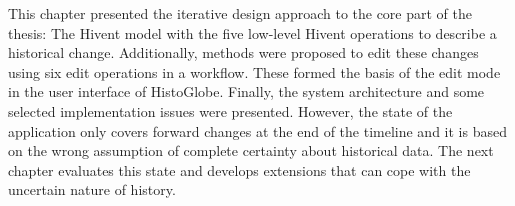 

\vspace{2em}

This chapter presented the iterative design approach to the core part of the thesis: The Hivent model with the five low-level Hivent operations to describe a historical change. Additionally, methods were proposed to edit these changes using six edit operations in a workflow.
These formed the basis of the edit mode in the user interface of HistoGlobe. Finally, the system architecture and some selected implementation issues were presented. However, the state of the application only covers forward changes at the end of the timeline and it is based on the wrong assumption of complete certainty about historical data. The next chapter evaluates this state and develops extensions that can cope with the uncertain nature of history.
